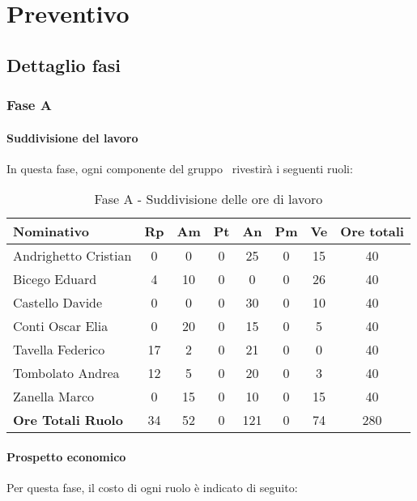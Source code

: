 \documentclass[../PianoProgetto.tex]{subfiles}
\begin{document}
	\section{Preventivo}
		\subsection{Dettaglio fasi}
			\subsubsection{Fase A}
				\paragraph{Suddivisione del lavoro}
					In questa fase, ogni componente del gruppo \leaf\ rivestirà i seguenti ruoli:
	
	\begin{table}[h]
		\begin{tabularx}{\textwidth}{l  * {6}{C}  c}
			\toprule
			\textbf{Nominativo} & \textbf{Rp} & \textbf{Am} & \textbf{Pt} 
						& \textbf{An} & \textbf{Pm} & \textbf{Ve} & \textbf{Ore totali} \\
			\midrule
			Andrighetto Cristian & 0 & 0 &	0 &	25 & 0 & 15 & 40 \\
			Bicego Eduard & 4 & 10 & 0 & 0 & 0 & 26 & 40 \\
			Castello Davide &	0 &	0 &	0 &	30 & 0 &	10 & 40 \\
			Conti Oscar Elia & 0 & 20 &	0 &	15 & 0 & 5 & 40 \\
			Tavella Federico &	17 & 2 & 0 & 21 & 0 & 0 & 40 \\
			Tombolato Andrea & 12 & 5 &	0 &	20 & 0 & 3 & 40 \\
			Zanella Marco & 0 & 15 & 0 & 10 & 0 & 15 & 40 \\
			\midrule			
			\textbf{Ore Totali Ruolo} & 34 & 52 & 0 & 121 &	0 &	74 & 280 \\
			\bottomrule
			
		\end{tabularx}
		\caption{Fase A - Suddivisione delle ore di lavoro}
		\label{tab:faseA_ore}
		
	\end{table}
	\paragraph{Prospetto economico}
					Per questa fase, il costo di ogni ruolo è indicato di seguito:
	
\end{document}

